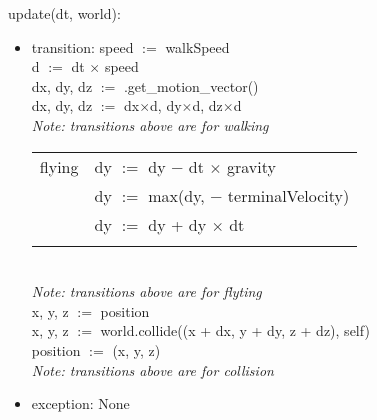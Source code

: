 \documentclass{article}
\begin{document}
\noindent update(dt, world):
\begin{itemize}
\item transition: speed $:=$ walkSpeed\\
    d $:=$ dt $\times$ speed\\
    dx, dy, dz $:=$ .get\_motion\_vector()\\
    dx, dy, dz $:=$ dx$\times$d, dy$\times$d, dz$\times$d\\
    \textit{Note: transitions above are for walking}\\
    
    \begin{tabular}{|l|l|}
    \hhline{|-|-|}
    flying & dy $:=$ dy $-$ dt $\times$ gravity\\
     & dy $:=$ max(dy, $-$ terminalVelocity)\\
     & dy $:=$ dy + dy $\times$ dt\\
    \hhline{|-|-|}
    \end{tabular}\\
    \textit{Note: transitions above are for flyting}\\
    
    x, y, z $:=$ position\\
    x, y, z $:=$ world.collide((x + dx, y + dy, z + dz), self)\\
    position $:=$ (x, y, z)\\
    \textit{Note: transitions above are for collision}
    
\item exception: None
\end{itemize}\vspace{6mm}
\end{document}
